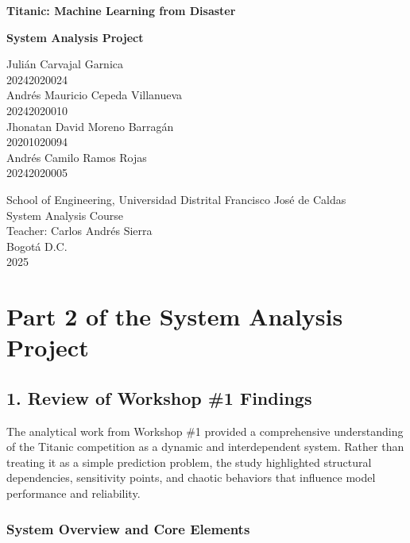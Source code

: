 \documentclass[12pt]{report}
\begin{document}
\begin{titlepage}
    \centering
    

    {\Large \textbf{Titanic: Machine Learning from Disaster} \par}
    \vspace{0.5cm}
    {\large \textbf{System Analysis Project} \par}
    \vspace{3cm}
    
    {\large 
    Julián Carvajal Garnica \\ 
    20242020024 \\[0.5cm]
    Andrés Mauricio Cepeda Villanueva \\
    20242020010 \\[0.5cm]
    Jhonatan David Moreno Barragán \\
    20201020094 \\[0.5cm]
    Andrés Camilo Ramos Rojas \\
    20242020005
    }
    
    \vfill
    

    School of Engineering, Universidad Distrital Francisco José de Caldas \\
    System Analysis Course \\
    Teacher: Carlos Andrés Sierra \\
    Bogotá D.C. \\
    2025
    
\end{titlepage}


\chapter*{Part 2 of the System Analysis Project}

\section*{1. Review of Workshop \#1 Findings}

The analytical work from Workshop \#1 provided a comprehensive understanding of the Titanic competition as a dynamic and interdependent system. Rather than treating it as a simple prediction problem, the study highlighted structural dependencies, sensitivity points, and chaotic behaviors that influence model performance and reliability.

\subsection*{System Overview and Core Elements}
\end{document}
